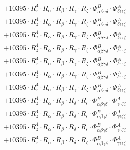 \documentclass{article}
\begin{document}
\begin{subequations}
\begin{gather}
\begin{array}{c}
 \\[0.2em] 		 + 10395 \cdot R_{z}^{4} \cdot R_{\alpha{}} \cdot R_{\beta{}} \cdot R_{\gamma{}} \cdot R_{\zeta{}} \cdot \Phi{}^{B}_{\alpha{}\beta{}\gamma{}\delta{}} \cdot \Phi{}^{A}_{\delta{}\epsilon{}\epsilon{}\zeta{}} 
 \\[0.2em] 		 + 10395 \cdot R_{z}^{4} \cdot R_{\alpha{}} \cdot R_{\beta{}} \cdot R_{\gamma{}} \cdot R_{\zeta{}} \cdot \Phi{}^{B}_{\alpha{}\beta{}\gamma{}\delta{}} \cdot \Phi{}^{A}_{\delta{}\epsilon{}\epsilon{}\zeta{}} 
 \\[0.2em] 		 + 10395 \cdot R_{z}^{4} \cdot R_{\alpha{}} \cdot R_{\beta{}} \cdot R_{\gamma{}} \cdot R_{\zeta{}} \cdot \Phi{}^{B}_{\alpha{}\beta{}\gamma{}\delta{}} \cdot \Phi{}^{A}_{\delta{}\epsilon{}\epsilon{}\zeta{}} 
 \\[0.2em] 		 + 10395 \cdot R_{z}^{4} \cdot R_{\alpha{}} \cdot R_{\beta{}} \cdot R_{\gamma{}} \cdot R_{\zeta{}} \cdot \Phi{}^{B}_{\alpha{}\beta{}\gamma{}\delta{}} \cdot \Phi{}^{A}_{\delta{}\epsilon{}\epsilon{}\zeta{}} 
 \\[0.2em] 		 + 10395 \cdot R_{z}^{4} \cdot R_{\alpha{}} \cdot R_{\beta{}} \cdot R_{\gamma{}} \cdot R_{\zeta{}} \cdot \Phi{}^{B}_{\alpha{}\beta{}\gamma{}\delta{}} \cdot \Phi{}^{A}_{\delta{}\epsilon{}\epsilon{}\zeta{}} 
 \\[0.2em] 		 + 10395 \cdot R_{z}^{4} \cdot R_{\alpha{}} \cdot R_{\beta{}} \cdot R_{\gamma{}} \cdot R_{\zeta{}} \cdot \Phi{}^{B}_{\alpha{}\beta{}\gamma{}\delta{}} \cdot \Phi{}^{A}_{\delta{}\epsilon{}\epsilon{}\zeta{}} 
 \\[0.2em] 		 + 10395 \cdot R_{z}^{4} \cdot R_{\alpha{}} \cdot R_{\beta{}} \cdot R_{\gamma{}} \cdot R_{\zeta{}} \cdot \Phi{}^{B}_{\alpha{}\beta{}\gamma{}\delta{}} \cdot \Phi{}^{A}_{\delta{}\epsilon{}\epsilon{}\zeta{}} 
 \\[0.2em] 		 + 10395 \cdot R_{z}^{4} \cdot R_{\alpha{}} \cdot R_{\beta{}} \cdot R_{\delta{}} \cdot R_{\epsilon{}} \cdot \Phi{}^{B}_{\alpha{}\beta{}\gamma{}\delta{}} \cdot \Phi{}^{A}_{\gamma{}\epsilon{}\zeta{}\zeta{}} 
 \\[0.2em] 		 + 10395 \cdot R_{z}^{4} \cdot R_{\alpha{}} \cdot R_{\beta{}} \cdot R_{\delta{}} \cdot R_{\epsilon{}} \cdot \Phi{}^{B}_{\alpha{}\beta{}\gamma{}\delta{}} \cdot \Phi{}^{A}_{\gamma{}\epsilon{}\zeta{}\zeta{}} 
 \\[0.2em] 		 + 10395 \cdot R_{z}^{4} \cdot R_{\alpha{}} \cdot R_{\beta{}} \cdot R_{\delta{}} \cdot R_{\epsilon{}} \cdot \Phi{}^{B}_{\alpha{}\beta{}\gamma{}\delta{}} \cdot \Phi{}^{A}_{\gamma{}\epsilon{}\zeta{}\zeta{}} 
 \\[0.2em] 		 + 10395 \cdot R_{z}^{4} \cdot R_{\alpha{}} \cdot R_{\beta{}} \cdot R_{\delta{}} \cdot R_{\zeta{}} \cdot \Phi{}^{B}_{\alpha{}\beta{}\gamma{}\delta{}} \cdot \Phi{}^{A}_{\gamma{}\epsilon{}\epsilon{}\zeta{}} 

\end{array}
\end{gather}
\end{subequations}
\end{document}
